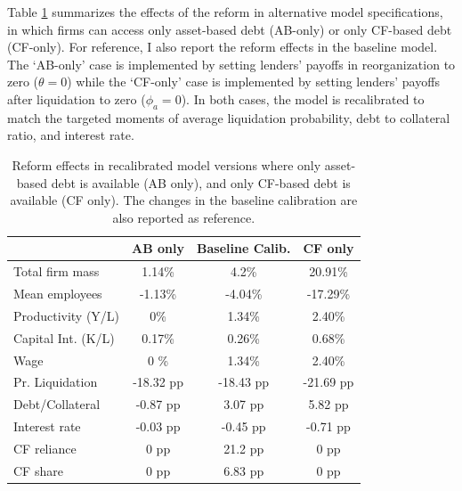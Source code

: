 \documentclass[12pt]{article}
\begin{document}
\noindent 
Table \ref{tab:percentage_changes} summarizes the effects of the reform in alternative model specifications, in which firms can access only asset-based debt (AB-only) or only CF-based debt (CF-only). For reference, I also report the reform effects in the baseline model. The `AB-only' case is implemented by setting lenders' payoffs in reorganization to zero ($\theta = 0$) while the `CF-only' case is implemented by setting lenders' payoffs after liquidation to zero ($\phi_a = 0$). In both cases, the model is recalibrated to match the targeted moments of average liquidation probability, debt to collateral ratio, and interest rate. 

\begin{table}[H]
    \centering
    \begin{tabular}{lccc}
    & \textbf{AB only} & \textbf{Baseline Calib.} & \textbf{CF only} \\    
    \toprule
    Total firm mass & 1.14\% & 4.2\%  & 20.91\%  \\  
    Mean employees & -1.13\% & -4.04\%  & -17.29\%   \\  
    Productivity (Y/L) & 0\% & 1.34\%  & 2.40\%  \\  
    Capital Int. (K/L) & 0.17\% & 0.26\%  & 0.68\%  \\  
    Wage & 0 \% & 1.34\%  & 2.40\%  \vspace{2mm}  \\  
    Pr. Liquidation & -18.32 pp & -18.43 pp  & -21.69 pp \\  
    Debt/Collateral & -0.87 pp & 3.07 pp  & 5.82 pp  \\  
    Interest rate & -0.03 pp & -0.45 pp  & -0.71 pp  \\  
    CF reliance & 0 pp & 21.2 pp  & 0 pp  \\    
    CF share & 0 pp & 6.83 pp  & 0 pp  \\  
    \bottomrule
    \end{tabular}
    \caption{\small Reform effects in recalibrated model versions where only asset-based debt is available (AB only), and only CF-based debt is available (CF only). The changes in the baseline calibration are also reported as reference.}
    \label{tab:percentage_changes}
\end{table}
\end{document}
